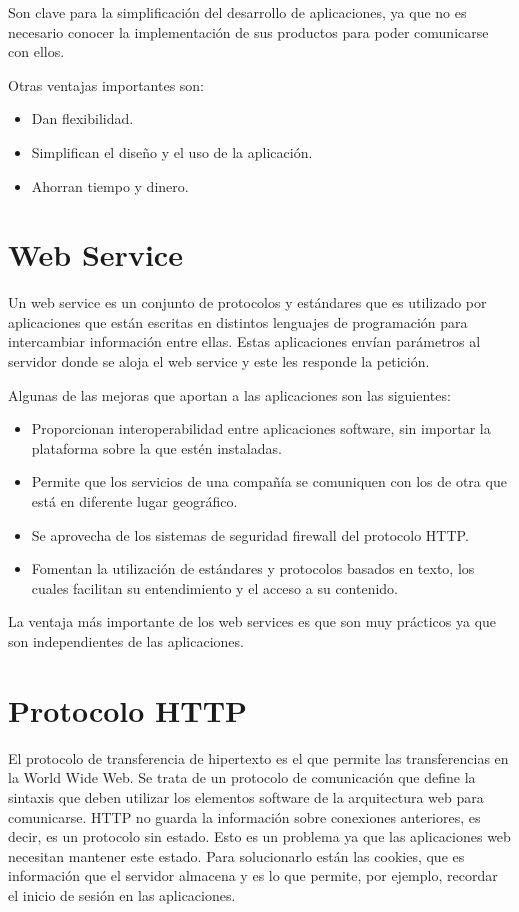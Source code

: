 Son clave para la simplificación del desarrollo de aplicaciones, ya que no es necesario conocer la implementación de sus productos para poder comunicarse con ellos. 

Otras ventajas importantes son:
\begin{itemize}
\tightlist
    \item Dan flexibilidad.
    \item Simplifican el diseño y el uso de la aplicación.
    \item Ahorran tiempo y dinero.
\end{itemize}

\section{Web Service}
Un web service \cite{web_service} es un conjunto de protocolos y estándares que es utilizado por aplicaciones que están escritas en distintos lenguajes de programación para intercambiar información entre ellas.
Estas aplicaciones envían parámetros al servidor donde se aloja el web service y este les responde la petición.

Algunas de las mejoras que aportan a las aplicaciones son las siguientes:
\begin{itemize}
\tightlist
    \item Proporcionan interoperabilidad entre aplicaciones software, sin importar la plataforma sobre la que estén instaladas.
    \item Permite que los servicios de una compañía se comuniquen con los de otra que está en diferente lugar geográfico.
    \item Se aprovecha de los sistemas de seguridad firewall del protocolo HTTP.
    \item Fomentan la utilización de estándares y protocolos basados en texto, los cuales facilitan su entendimiento y el acceso a su contenido.
\end{itemize}

La ventaja más importante de los web services es que son muy prácticos ya que son independientes de las aplicaciones.

\section{Protocolo HTTP}
El protocolo de transferencia de hipertexto \cite{http} es el que permite las transferencias en la World Wide Web. Se trata de un protocolo de comunicación que define la sintaxis que deben utilizar los elementos software de la arquitectura web para comunicarse. HTTP no guarda la información sobre conexiones anteriores, es decir, es un protocolo sin estado. Esto es un problema ya que las aplicaciones web necesitan mantener este estado. Para solucionarlo están las cookies, que es información que el servidor almacena y es lo que permite, por ejemplo, recordar el inicio de sesión en las aplicaciones.

